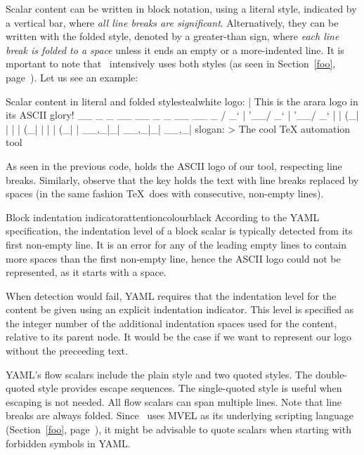 Scalar content can be written in block notation, using a literal style, indicated by a vertical bar, where \emph{all line breaks are significant}. Alternatively, they can be written with the folded style, denoted by a greater-than sign, where \emph{each line break is folded to a space} unless it ends an empty or a more-indented line. It is mportant to note that \arara\ intensively uses both styles (as seen in Section~\ref{foo}, page~\pageref{foo}). Let us see an example:

\begin{codebox}{Scalar content in literal and folded styles}{teal}{\icnote}{white}
logo: |
  This is the arara logo
  in its ASCII glory! 
    __ _ _ __ __ _ _ __ __ _ 
   / _` | '__/ _` | '__/ _` |
  | (_| | | | (_| | | | (_| |
   \__,_|_|  \__,_|_|  \__,_|
slogan: >
  The cool TeX
  automation tool
\end{codebox}

As seen in the previous code,  holds the ASCII logo of our tool, respecting line breaks. Similarly, observe that the  key holds the text with line breaks replaced by spaces (in the same fashion \TeX\ does with consecutive, non-empty lines).

\begin{messagebox}{Block indentation indicator}{attentioncolour}{\icattention}{black}
\setlength{\parskip}{1em}
According to the YAML specification, the indentation level of a block scalar is typically detected from its first non-empty line. It is an error for any of the leading empty lines to contain more spaces than the first non-empty line, hence the ASCII logo could not be represented, as it starts with a space.

When detection would fail, YAML requires that the indentation level for the content be given using an explicit indentation indicator. This level is specified as the integer number of the additional indentation spaces used for the content, relative to its parent node. It would be the case if we want to represent our logo without the preceeding text.
\end{messagebox}

YAML's flow scalars include the plain style and two quoted styles. The double-quoted style provides escape sequences. The single-quoted style is useful when escaping is not needed. All flow scalars can span multiple lines. Note that line breaks are always folded. Since \arara\ uses MVEL as its underlying scripting language (Section~\ref{foo}, page~\pageref{foo}), it might be advisable to quote scalars when starting with forbidden symbols in YAML.

